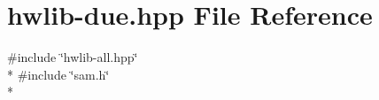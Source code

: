 \hypertarget{hwlib-due_8hpp}{}\section{hwlib-\/due.hpp File Reference}
\label{hwlib-due_8hpp}
{\ttfamily \#include \char`\"{}hwlib-\/all.\+hpp\char`\"{}}\\*
{\ttfamily \#include \char`\"{}sam.\+h\char`\"{}}\\*

